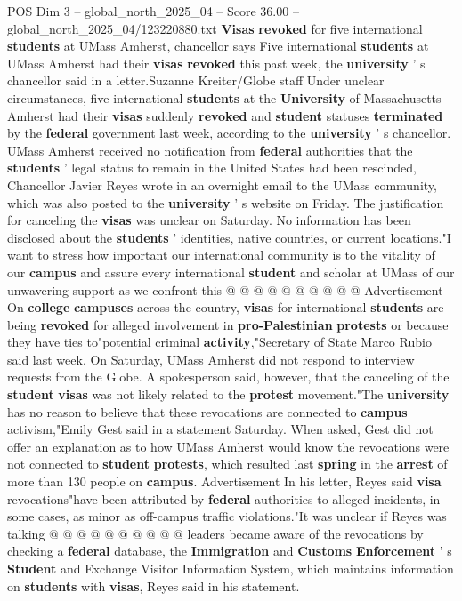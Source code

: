 \begin{textsample}{POS Dim 3 – global\_north\_2025\_04 – Score 36.00 – global\_north\_2025\_04/123220880.txt}  \label{ex:f3_pos_051}
\textbf{Visas} \textbf{revoked} for five international \textbf{students} at UMass Amherst, chancellor says Five international \textbf{students} at UMass Amherst had their \textbf{visas} \textbf{revoked} this past week, the \textbf{university} ' s chancellor said in a letter.Suzanne Kreiter/Globe staff Under unclear circumstances, five international \textbf{students} at the \textbf{University} of Massachusetts Amherst had their \textbf{visas} suddenly \textbf{revoked} and \textbf{student} statuses \textbf{terminated} by the \textbf{federal} government last week, according to the \textbf{university} ' s chancellor.
UMass Amherst received no notification from \textbf{federal} authorities that the \textbf{students} ' legal status to remain in the United States had been rescinded, Chancellor Javier Reyes wrote in an overnight email to the UMass community, which was also posted to the \textbf{university} ' s website on Friday.
The justification for canceling the \textbf{visas} was unclear on Saturday.
No information has been disclosed about the \textbf{students} ' identities, native countries, or current locations."I want to stress how important our international community is to the vitality of our \textbf{campus} and assure every international \textbf{student} and scholar at UMass of our unwavering support as we confront this @ @ @ @ @ @ @ @ @ @ Advertisement On \textbf{college} \textbf{campuses} across the country, \textbf{visas} for international \textbf{students} are being \textbf{revoked} for alleged involvement in \textbf{pro-Palestinian} \textbf{protests} or because they have ties to"potential criminal \textbf{activity},"Secretary of State Marco Rubio said last week.
On Saturday, UMass Amherst did not respond to interview requests from the Globe.
A spokesperson said, however, that the canceling of the \textbf{student} \textbf{visas} was not likely related to the \textbf{protest} movement."The \textbf{university} has no reason to believe that these revocations are connected to \textbf{campus} activism,"Emily Gest said in a statement Saturday.
When asked, Gest did not offer an explanation as to how UMass Amherst would know the revocations were not connected to \textbf{student} \textbf{protests}, which resulted last \textbf{spring} in the \textbf{arrest} of more than 130 people on \textbf{campus}.
Advertisement In his letter, Reyes said \textbf{visa} revocations"have been attributed by \textbf{federal} authorities to alleged incidents, in some cases, as minor as off-campus traffic violations."It was unclear if Reyes was talking @ @ @ @ @ @ @ @ @ @ leaders became aware of the revocations by checking a \textbf{federal} database, the \textbf{Immigration} and \textbf{Customs} \textbf{Enforcement} ' s \textbf{Student} and Exchange Visitor Information System, which maintains information on \textbf{students} with \textbf{visas}, Reyes said in his statement.

\end{textsample}
